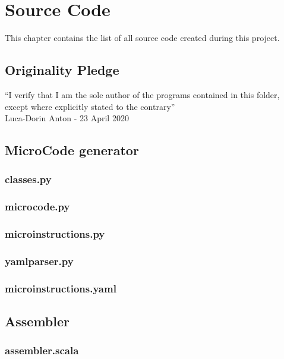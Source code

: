 \chapter{Source Code}
This chapter contains the list of all source code created during this project.

\section{Originality Pledge}
``I verify that I am the sole author of the programs contained in this folder, except where explicitly stated to the contrary'' \\
Luca-Dorin Anton - 23 April 2020
\section{MicroCode generator}

\subsection{classes.py}

\subsection{microcode.py}

\subsection{microinstructions.py}

\subsection{yamlparser.py}

\subsection{microinstructions.yaml}


\section{Assembler}
\subsection{assembler.scala}

